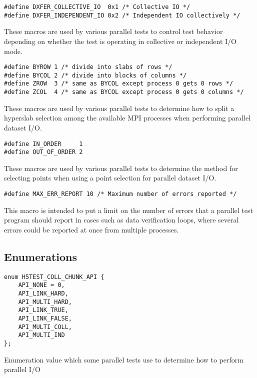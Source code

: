 \documentclass[../HDF5_RFC.tex]{subfiles}
\begin{document}
\begin{verbatim}
#define DXFER_COLLECTIVE_IO  0x1 /* Collective IO */
#define DXFER_INDEPENDENT_IO 0x2 /* Independent IO collectively */
\end{verbatim}

These macros are used by various parallel tests to control test behavior depending on whether
the test is operating in collective or independent I/O mode.

\begin{verbatim}
#define BYROW 1 /* divide into slabs of rows */
#define BYCOL 2 /* divide into blocks of columns */
#define ZROW  3 /* same as BYCOL except process 0 gets 0 rows */
#define ZCOL  4 /* same as BYCOL except process 0 gets 0 columns */
\end{verbatim}

These macros are used by various parallel tests to determine how to split a hyperslab selection
among the available MPI processes when performing parallel dataset I/O.

\begin{verbatim}
#define IN_ORDER     1
#define OUT_OF_ORDER 2
\end{verbatim}

These macros are used by various parallel tests to determine the method for selecting points
when using a point selection for parallel dataset I/O.

\begin{verbatim}
#define MAX_ERR_REPORT 10 /* Maximum number of errors reported */
\end{verbatim}

This macro is intended to put a limit on the number of errors that a parallel test program
should report in cases such as data verification loops, where several errors could be reported
at once from multiple processes.

\subsection{Enumerations}

\begin{verbatim}
enum H5TEST_COLL_CHUNK_API {
    API_NONE = 0,
    API_LINK_HARD,
    API_MULTI_HARD,
    API_LINK_TRUE,
    API_LINK_FALSE,
    API_MULTI_COLL,
    API_MULTI_IND
};
\end{verbatim}

Enumeration value which some parallel tests use to determine how to perform parallel I/O
\end{document}
